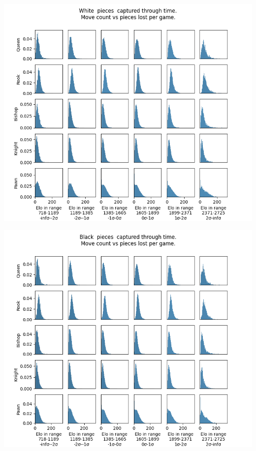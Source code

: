\documentclass[11pt]{article}
\begin{document}
\begin{center}
\includegraphics[width=\textwidth]{Images/_HIST_Queen_Rook_Bishop_Knight_Pawn_WHITE_ELO.png}
\end{center}

\begin{center}
\includegraphics[width=\textwidth]{Images/_HIST_Queen_Rook_Bishop_Knight_Pawn_BLACK_ELO.png}
\end{center}
\end{document}
